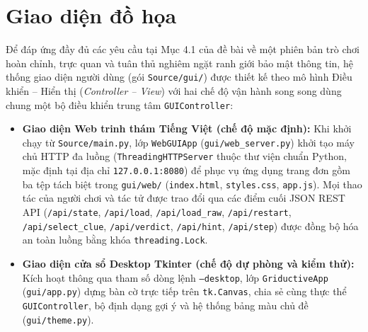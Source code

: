 \section{Giao diện đồ họa}
\label{sec:giao-dien-do-hoa}

Để đáp ứng đầy đủ các yêu cầu tại Mục 4.1 của đề bài về một phiên bản trò chơi hoàn chỉnh, trực quan và tuân thủ nghiêm ngặt ranh giới bảo mật thông tin, hệ thống giao diện người dùng (gói \texttt{Source/gui/}) được thiết kế theo mô hình Điều khiển -- Hiển thị (\emph{Controller -- View}) với hai chế độ vận hành song song dùng chung một bộ điều khiển trung tâm \texttt{GUIController}:

\begin{itemize}
    \item \textbf{Giao diện Web trinh thám Tiếng Việt (chế độ mặc định):} Khi khởi chạy từ \texttt{Source/main.py}, lớp \texttt{WebGUIApp} (\texttt{gui/web\_server.py}) khởi tạo máy chủ HTTP đa luồng (\texttt{ThreadingHTTPServer} thuộc thư viện chuẩn Python, mặc định tại địa chỉ \texttt{127.0.0.1:8080}) để phục vụ ứng dụng trang đơn gồm ba tệp tách biệt trong \texttt{gui/web/} (\texttt{index.html}, \texttt{styles.css}, \texttt{app.js}). Mọi thao tác của người chơi và tác tử được trao đổi qua các điểm cuối JSON REST API (\texttt{/api/state}, \texttt{/api/load}, \texttt{/api/load\_raw}, \texttt{/api/restart}, \texttt{/api/select\_clue}, \texttt{/api/verdict}, \texttt{/api/hint}, \texttt{/api/step}) được đồng bộ hóa an toàn luồng bằng khóa \texttt{threading.Lock}.
    \item \textbf{Giao diện cửa sổ Desktop Tkinter (chế độ dự phòng và kiểm thử):} Kích hoạt thông qua tham số dòng lệnh \texttt{--desktop}, lớp \texttt{GriductiveApp} (\texttt{gui/app.py}) dựng bàn cờ trực tiếp trên \texttt{tk.Canvas}, chia sẻ cùng thực thể \texttt{GUIController}, bộ định dạng gợi ý và hệ thống bảng màu chủ đề (\texttt{gui/theme.py}).
\end{itemize}

